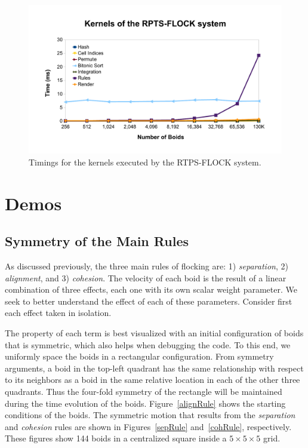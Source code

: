 \begin{figure}[htbp]
\begin{center}
\includegraphics[scale=0.7]{figures/kernelsPlot.pdf}
\caption{Timings for the kernels executed by the RTPS-FLOCK system.}
\label{kernelBench}
\end{center}
\end{figure}


\section{Demos}

\subsection{Symmetry of the Main Rules}
As discussed previously, the three main rules of flocking are: 1) \textit{separation}, 2) \textit{alignment}, and 3) \textit{cohesion}. The velocity of each boid is the result of a linear combination of three effects, each one with its own scalar weight parameter. We seek to better understand the effect of each of these parameters. Consider first each effect taken in isolation.

The property of each term is best visualized with an initial configuration of boids that is symmetric, which also helps when debugging the code. To this end, we uniformly space the boids in a rectangular configuration.  From symmetry arguments, a boid in the top-left quadrant has the same relationship with respect to its neighbors as a boid in the same relative location in each of the other three quadrants. Thus the four-fold symmetry of the rectangle will be maintained during the time evolution of the boids. Figure~\ref{alignRule} shows the starting conditions of the boids. The symmetric motion that results from the \textit{separation} and \textit{cohesion} rules are shown in Figures~\ref{sepRule} and~\ref{cohRule}, respectively. These figures show 144 boids in a centralized square inside a $5\times 5\times 5$ grid.

